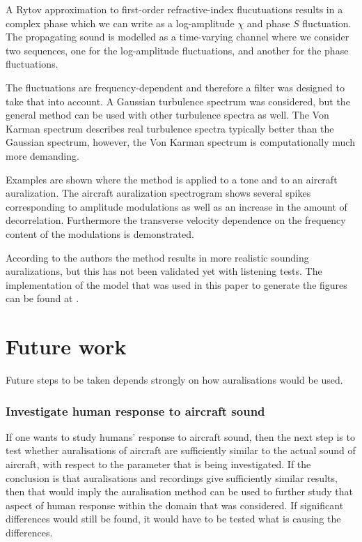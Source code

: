 A Rytov approximation to first-order refractive-index flucutuations results in a complex
phase which we can write as a log-amplitude $\chi$ and phase $S$ fluctuation.
The propagating sound is modelled as a time-varying channel where we consider
two sequences, one for the log-amplitude fluctuations, and another for the phase
fluctuations.

The fluctuations are frequency-dependent and therefore a filter was designed to take that into account.
A Gaussian turbulence spectrum was considered, but the general method can be
used with other turbulence spectra as well. The Von Karman spectrum describes
real turbulence spectra typically better than the Gaussian spectrum, however,
the Von Karman spectrum is computationally much more demanding.

Examples are shown where the method is applied to a tone and to an aircraft
auralization. The aircraft auralization spectrogram shows several spikes
corresponding to amplitude modulations as well as an increase in the amount of
decorrelation. Furthermore the transverse velocity dependence on the frequency
content of the modulations is demonstrated.

According to the authors the method results in more realistic sounding
auralizations, but this has not been validated yet with listening tests. The
implementation of the model that was used in this paper to generate the figures
can be found at \cite{Rietdijk2016}.

\section{Future work}
Future steps to be taken depends strongly on how auralisations would
be used.

\subsubsection*{Investigate human response to aircraft sound}
If one wants to study humans' response to aircraft sound, then the next step is
to test whether auralisations of aircraft are sufficiently similar to the actual
sound of aircraft, with respect to the parameter that is being investigated. If
the conclusion is that auralisations and recordings give sufficiently similar
results, then that would imply the auralisation method can be used to further
study that aspect of human response within the domain that was considered. If
significant differences would still be found, it would have to be tested what is
causing the differences.

